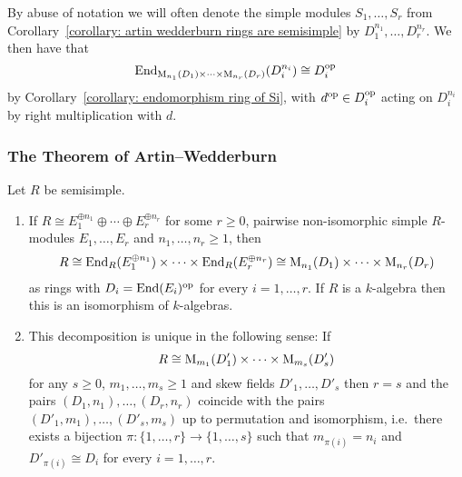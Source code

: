 \begin{notation}
  \label{notation: simple modules over products of matrix rings}
  By abuse of notation we will often denote the simple modules $S_1, \dotsc, S_r$ from Corollary~\ref{corollary: artin wedderburn rings are semisimple} by $D_1^{n_1}, \dotsc, D_r^{n_r}$.
  We then have that
  \[
          \operatorname{End}_{\operatorname{M}_{n_1}(D_1) \times \dotsb \times \operatorname{M}_{n_r}(D_r)}(D_i^{n_i})
    \cong D_i^{\operatorname{op}}
  \]
  by Corollary~\ref{corollary: endomorphism ring of Si}, with $d^{\operatorname{op}} \in D_i^{\operatorname{op}}$ acting on $D_i^{n_i}$ by right multiplication with $d$.
\end{notation}







\subsubsection{The Theorem of Artin--Wedderburn}


\begin{theorem}
  \label{theorem: artin wedderburn theorem}
  Let $R$ be semisimple.
  \begin{enumerate}
    \item
      If $R \cong E_1^{\oplus n_1} \oplus \dotsb \oplus E_r^{\oplus n_r}$ for some $r \geq 0$, pairwise non-isomorphic simple $R$-modules $E_1, \dotsc, E_r$ and $n_1, \dotsc, n_r \geq 1$, then
      \begin{align*}
              R
        \cong \operatorname{End}_R(E_1^{\oplus n_1}) \times \dotsb \times \operatorname{End}_R(E_r^{\oplus n_r})
        \cong \operatorname{M}_{n_1}(D_1) \times \dotsb \times  \operatorname{M}_{n_r}(D_r)
      \end{align*}
      as rings with $D_i = \operatorname{End}(E_i)^{\operatorname{op}}$ for every $i = 1, \dotsc, r$.
      If $R$ is a $k$-algebra then this is an isomorphism of $k$-algebras.
    \item
      This decomposition is unique in the following sense:
      If
      \[
              R
        \cong \operatorname{M}_{m_1}(D'_1) \times \dotsb \times \operatorname{M}_{m_s}(D'_s)
      \]
      for any $s \geq 0$, $m_1, \dotsc, m_s \geq 1$ and skew fields $D'_1, \dotsc, D'_s$ then $r = s$ and the pairs $(D_1, n_1), \dotsc, (D_r, n_r)$ coincide with the pairs $(D'_1, m_1), \dotsc, (D'_s, m_s)$ up to permutation and isomorphism, i.e.\ there exists a bijection $\pi \colon \{1, \dotsc, r\} \to \{1, \dotsc, s\}$ such that $m_{\pi(i)} = n_i$ and $D'_{\pi(i)} \cong D_i$ for every $i = 1, \dotsc, r$.
  \end{enumerate}
\end{theorem}


